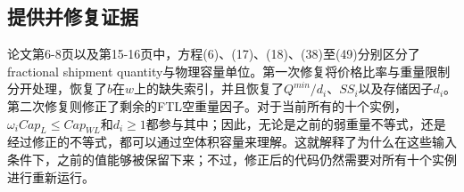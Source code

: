 \documentclass{article}
\begin{document}
\subsection*{提供并修复证据}
论文第6-8页以及第15-16页中，方程(6)、(17)、(18)、(38)至(49)分别区分了 fractional shipment quantity与物理容量单位。第一次修复将价格比率与重量限制分开处理，恢复了$b$在$w$上的缺失索引，并且恢复了$Q^{min}/d_i$、$SS_i$以及存储因子$d_i$。第二次修复则修正了剩余的FTL空重量因子。对于当前所有的十个实例，$\omega_i Cap_L\le Cap_{WL}$和$d_i\ge1$都参与其中；因此，无论是之前的弱重量不等式，还是经过修正的不等式，都可以通过空体积容量来理解。这就解释了为什么在这些输入条件下，之前的值能够被保留下来；不过，修正后的代码仍然需要对所有十个实例进行重新运行。
\end{document}
